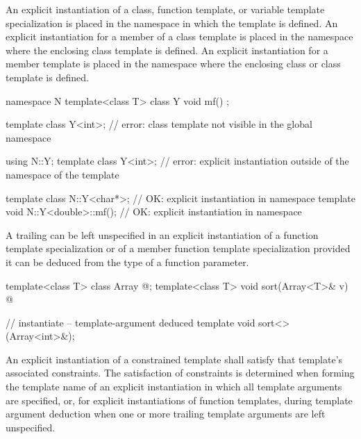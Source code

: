 \pnum
An explicit instantiation of a class, function template, or variable template
specialization is
placed in the namespace in which the template is defined.
An explicit instantiation for a member of a class template is placed in
the namespace where the enclosing class template is defined.
An explicit instantiation for a member template is placed in the namespace
where the enclosing class or class template is defined.
\begin{example}

\begin{codeblock}
namespace N {
  template<class T> class Y { void mf() { } };
}

template class Y<int>;          // error: class template  not visible in the global namespace

using N::Y;
template class Y<int>;          // error: explicit instantiation outside of the namespace of the template

template class N::Y<char*>;             // OK: explicit instantiation in namespace 
template void N::Y<double>::mf();       // OK: explicit instantiation in namespace 
\end{codeblock}
\end{example}

\pnum
A trailing
can be left unspecified in an explicit instantiation of a function template
specialization or of a member function template specialization provided
it can be deduced from the type of a function parameter.
\begin{example}
\begin{codeblock}
template<class T> class Array { @\commentellip@ };
template<class T> void sort(Array<T>& v) { @\commentellip@ }

// instantiate  -- template-argument deduced
template void sort<>(Array<int>&);
\end{codeblock}
\end{example}

\pnum
\begin{note}
An explicit instantiation of a constrained template
shall satisfy that template's associated constraints.
The satisfaction of constraints is determined
when forming the template name of an explicit instantiation
in which all template arguments are specified,
or, for explicit instantiations of function templates,
during template argument deduction
when one or more trailing template arguments are left unspecified.
\end{note}

